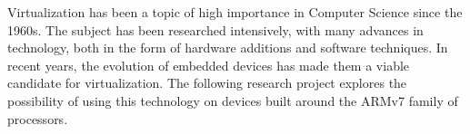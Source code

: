 
Virtualization has been a topic of high importance in Computer Science since the 1960s. The subject has been researched intensively, with many advances in technology, both in the form of hardware additions and software techniques. In recent years, the evolution of embedded devices has made them a viable candidate for virtualization. The following research project explores the possibility of using this technology on devices built around the ARMv7 family of processors. 
